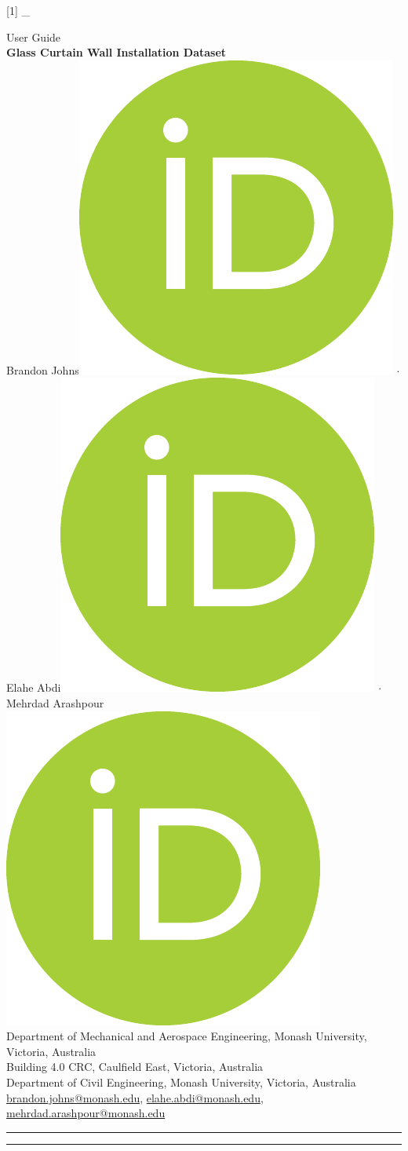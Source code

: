 [1]{
    _{}
}



\pagestyle{fancy}
\fancyhf{}%
\renewcommand{\headrulewidth}{0pt}
\fancyfoot[R]{\footnotesize \thepage}

\begin{center}
    {\LARGE User Guide\\[0.5\baselineskip]
    \textbf{Glass Curtain Wall Installation Dataset}}\\[1\baselineskip]
    
    Brandon Johns\footnotemark[1]\footnotemark[2] \href{https://orcid.org/0000-0002-8761-5432}{\includegraphics[height=2ex]{fig/ORCIDiD_iconvector.pdf}} $\boldsymbol{\cdot}$
    Elahe Abdi\footnotemark[1] \href{https://orcid.org/0000-0003-3748-0442}{\includegraphics[height=2ex]{fig/ORCIDiD_iconvector.pdf}} $\boldsymbol{\cdot}$
    Mehrdad Arashpour\footnotemark[3] \href{https://orcid.org/0000-0003-4148-3160}{\includegraphics[height=2ex]{fig/ORCIDiD_iconvector.pdf}}\\[0.3\baselineskip]
    \footnotemark[1]Department of Mechanical and Aerospace Engineering, Monash University, Victoria, Australia\\
    \footnotemark[2]Building 4.0 CRC, Caulfield East, Victoria, Australia\\
    \footnotemark[3]Department of Civil Engineering, Monash University, Victoria, Australia\\
    \href{mailto:brandon.johns@monash.edu}{brandon.johns@monash.edu},
    \href{mailto:elahe.abdi@monash.edu}{elahe.abdi@monash.edu},
    \href{mailto:mehrdad.arashpour@monash.edu}{mehrdad.arashpour@monash.edu}\\
    \rule{\textwidth}{1.6pt}\vspace*{-1\baselineskip}\vspace*{2pt} %
    \rule{\textwidth}{0.4pt}\\[0.5\baselineskip] %
\end{center}

